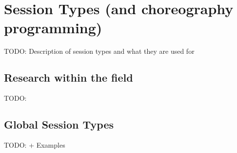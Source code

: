 \section{Session Types (and choreography programming)}
TODO: Description of session types and what they are used for

\subsection{Research within the field}
TODO: 

\subsection{Global Session Types}
TODO:  + Examples